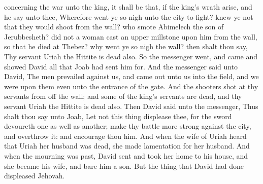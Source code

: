 concerning the war unto the king, it shall be that, if the king’s wrath arise, and he say unto thee, Wherefore went ye so nigh unto the city to fight? knew ye not that they would shoot from the wall? who smote Abimelech the son of Jerubbesheth? did not a woman cast an upper millstone upon him from the wall, so that he died at Thebez? why went ye so nigh the wall? then shalt thou say, Thy servant Uriah the Hittite is dead also.  So the messenger went, and came and showed David all that Joab had sent him for. And the messenger said unto David, The men prevailed against us, and came out unto us into the field, and we were upon them even unto the entrance of the gate. And the shooters shot at thy servants from off the wall; and some of the king’s servants are dead, and thy servant Uriah the Hittite is dead also. Then David said unto the messenger, Thus shalt thou say unto Joab, Let not this thing displease thee, for the sword devoureth one as well as another; make thy battle more strong against the city, and overthrow it: and encourage thou him.  And when the wife of Uriah heard that Uriah her husband was dead, she made lamentation for her husband. And when the mourning was past, David sent and took her home to his house, and she became his wife, and bare him a son. But the thing that David had done displeased Jehovah. 


